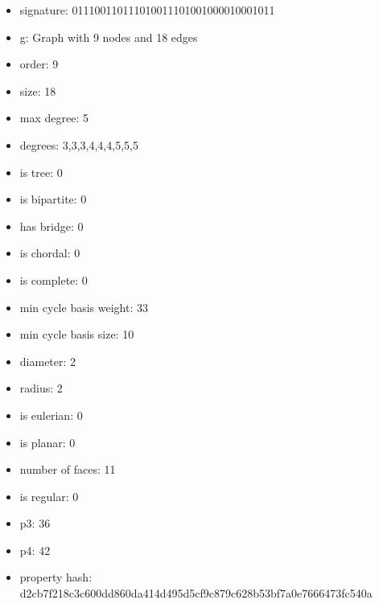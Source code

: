 \newpage
\begin{figure}
\end{figure}
\begin{itemize}
\item signature: 011100110111010011101001000010001011
\item g: Graph with 9 nodes and 18 edges
\item order: 9
\item size: 18
\item max degree: 5
\item degrees: 3,3,3,4,4,4,5,5,5
\item is tree: 0
\item is bipartite: 0
\item has bridge: 0
\item is chordal: 0
\item is complete: 0
\item min cycle basis weight: 33
\item min cycle basis size: 10
\item diameter: 2
\item radius: 2
\item is eulerian: 0
\item is planar: 0
\item number of faces: 11
\item is regular: 0
\item p3: 36
\item p4: 42
\item property hash: d2cb7f218c3c600dd860da414d495d5cf9c879c628b53bf7a0e7666473fc540a
\end{itemize}
